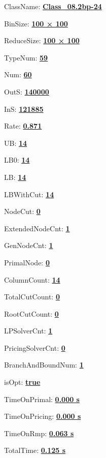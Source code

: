 \documentclass[11pt]{article}
\begin{document}
\pagestyle{empty}


ClassName: \underline{\textbf{Class_08.2bp-24}}
\par
BinSize: \underline{\textbf{100 × 100}}
\par
ReduceSize: \underline{\textbf{100 × 100}}
\par
TypeNum: \underline{\textbf{59}}
\par
Num: \underline{\textbf{60}}
\par
OutS: \underline{\textbf{140000}}
\par
InS: \underline{\textbf{121885}}
\par
Rate: \underline{\textbf{0.871}}
\par
UB: \underline{\textbf{14}}
\par
LB0: \underline{\textbf{14}}
\par
LB: \underline{\textbf{14}}
\par
LBWithCut: \underline{\textbf{14}}
\par
NodeCut: \underline{\textbf{0}}
\par
ExtendedNodeCnt: \underline{\textbf{1}}
\par
GenNodeCnt: \underline{\textbf{1}}
\par
PrimalNode: \underline{\textbf{0}}
\par
ColumnCount: \underline{\textbf{14}}
\par
TotalCutCount: \underline{\textbf{0}}
\par
RootCutCount: \underline{\textbf{0}}
\par
LPSolverCnt: \underline{\textbf{1}}
\par
PricingSolverCnt: \underline{\textbf{0}}
\par
BranchAndBoundNum: \underline{\textbf{1}}
\par
isOpt: \underline{\textbf{true}}
\par
TimeOnPrimal: \underline{\textbf{0.000 s}}
\par
TimeOnPricing: \underline{\textbf{0.000 s}}
\par
TimeOnRmp: \underline{\textbf{0.063 s}}
\par
TotalTime: \underline{\textbf{0.125 s}}
\par
\newpage


\end{document}
